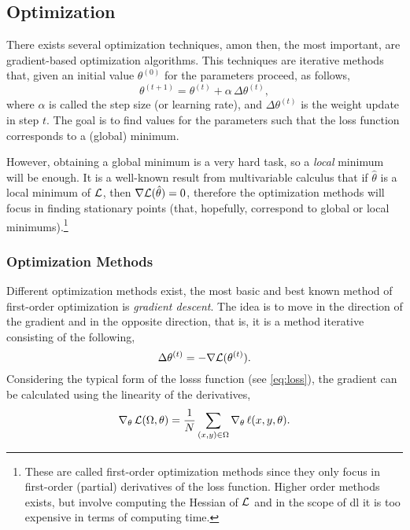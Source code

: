 \subsection{Optimization}\label{sec:optimization}

There exists several optimization techniques, amon then, the most important,
are gradient-based optimization algorithms. This techniques are iterative
methods that, given an initial value \(\theta^{(0)}\) for the parameters
proceed, as follows,
\begin{equation}
  \theta^{(t + 1)} = \theta^{(t)} + \alpha\,\Delta\theta^{(t)},
\end{equation}
where \(\alpha\) is called the step size (or learning rate), and
\(\Delta\theta^{(t)}\) is the weight update in step \(t\). The goal is to find
values for the parameters such that the loss function corresponds to a (global)
minimum.

However, obtaining a global minimum is a very hard task, so a \emph{local}
minimum will be enough. It is a well-known result from multivariable calculus
that if \(\hat{\theta}\) is a local minimum of \(\mathcal{L}\), then
\(\nabla\mathcal{L}(\hat{\theta}) = 0\), therefore the optimization methods will
focus in finding stationary points (that, hopefully, correspond to global or
local minimums).\footnote{These are called first-order optimization methods
  since they only focus in first-order (partial) derivatives of the loss
  function. Higher order methods exists, but involve computing the Hessian of
  \(\mathcal{L}\) and in the scope of \gls{dl} it is too expensive in terms of
  computing time.}

\subsubsection{Optimization Methods}

Different optimization methods exist, the most basic and best known method of
first-order optimization is \emph{gradient descent}. The idea is to move in the
direction of the gradient and in the opposite direction, that is, it is a
method iterative consisting of the following,
\begin{equation}\label{eq:gd}
  \Delta\theta^{(t)} = - \nabla\mathcal{L}(\theta^{(t)}).
\end{equation}
Considering the typical form of the losss function (see \vref{eq:loss}), the
gradient can be calculated using the linearity of the derivatives,
\begin{equation}\label{eq:nabla-loss}
  \nabla_{\theta}\,\mathcal{L}(\Omega, \theta) =
  \frac{1}{N} \sum_{(x, y) \in \Omega} \nabla_{\theta}\,\ell (x, y, \theta).
\end{equation}

